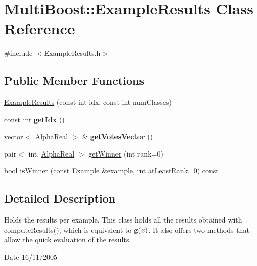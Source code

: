 \hypertarget{classMultiBoost_1_1ExampleResults}{\section{Multi\-Boost\-:\-:Example\-Results Class Reference}
\label{classMultiBoost_1_1ExampleResults}
}


{\ttfamily \#include $<$Example\-Results.\-h$>$}

\subsection*{Public Member Functions}
\begin{DoxyCompactItemize}
\item 
\hyperlink{classMultiBoost_1_1ExampleResults_ac0ba46f037634d5e39f174403c808c4e}{Example\-Results} (const int idx, const int num\-Classes)
\item 
\hypertarget{classMultiBoost_1_1ExampleResults_a744760409a943787f542f8983fbfdc9c}{const int {\bfseries get\-Idx} ()}\label{classMultiBoost_1_1ExampleResults_a744760409a943787f542f8983fbfdc9c}

\item 
\hypertarget{classMultiBoost_1_1ExampleResults_a240b5dfda16c94d9b480239c2531f952}{vector$<$ \hyperlink{Defaults_8h_a80184c4fd10ab70a1a17c5f97dcd1563}{Alpha\-Real} $>$ \& {\bfseries get\-Votes\-Vector} ()}\label{classMultiBoost_1_1ExampleResults_a240b5dfda16c94d9b480239c2531f952}

\item 
pair$<$ int, \hyperlink{Defaults_8h_a80184c4fd10ab70a1a17c5f97dcd1563}{Alpha\-Real} $>$ \hyperlink{classMultiBoost_1_1ExampleResults_a41c026e0131cfd2caeb7956afce93cc0}{get\-Winner} (int rank=0)
\item 
bool \hyperlink{classMultiBoost_1_1ExampleResults_af9cb40d43d2f0264f901a199ba5dc5ec}{is\-Winner} (const \hyperlink{classMultiBoost_1_1Example}{Example} \&example, int at\-Least\-Rank=0) const 
\end{DoxyCompactItemize}


\subsection{Detailed Description}
Holds the results per example. This class holds all the results obtained with compute\-Results(), which is equivalent to ${\bf g}(x)$. It also offers two methods that allow the quick evaluation of the results. \begin{DoxyDate}{Date}
16/11/2005 
\end{DoxyDate}


